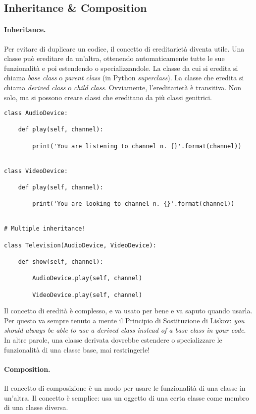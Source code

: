\documentclass[10pt, a4paper, titlepage]{book}
\begin{document}
\subsection{Inheritance \& Composition}

\paragraph{Inheritance.} Per evitare di duplicare un codice, il concetto di ereditarietà diventa utile. Una classe può ereditare da un'altra, ottenendo automaticamente tutte le sue funzionalità e poi estendendo o specializzandole.
La classe da cui si eredita si chiama \textit{base class} o \textit{parent class} (in Python \textit{superclass}). La classe che eredita si chiama \textit{derived class} o \textit{child class}.
Ovviamente, l'ereditarietà è transitiva. Non solo, ma si possono creare classi che ereditano da più classi genitrici.

\begin{verbatim}
class AudioDevice:

	def play(self, channel):

		print('You are listening to channel n. {}'.format(channel))


class VideoDevice:

	def play(self, channel):

		print('You are looking to channel n. {}'.format(channel))


# Multiple inheritance!

class Television(AudioDevice, VideoDevice):

	def show(self, channel):

		AudioDevice.play(self, channel)

		VideoDevice.play(self, channel)
\end{verbatim}

Il concetto di eredità è complesso, e va usato per bene e va saputo quando usarla. Per questo va sempre tenuto a mente il Principio di Sostituzione di Liskov: \textit{you should always be able to use a derived class instead of a base class in your code}. In altre parole, una classe derivata dovrebbe estendere o specializzare le funzionalità di una classe base, mai restringerle!

\paragraph{Composition.} Il concetto di composizione è un modo per usare le funzionalità di una classe in un'altra. Il concetto è semplice: usa un oggetto di una certa classe come membro di una classe diversa. 
\end{document}
